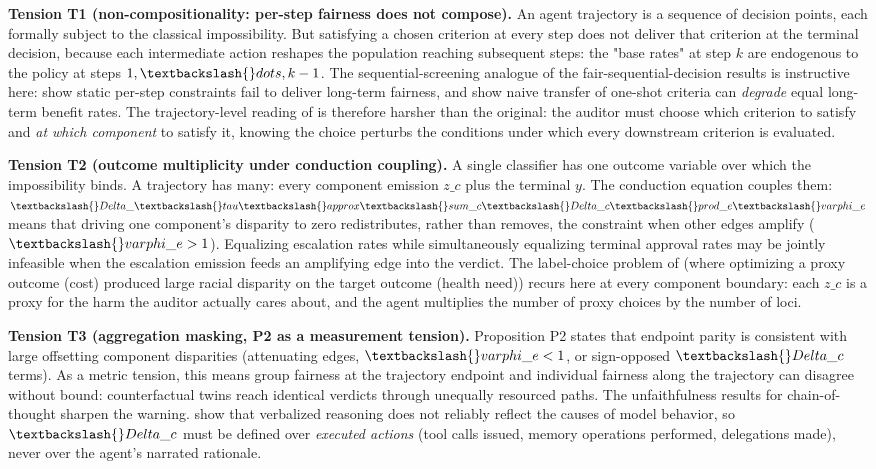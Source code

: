 \documentclass[10pt]{article}
\begin{document}
\textbf{Tension T1 (non-compositionality: per-step fairness does not compose).} An agent trajectory is a sequence of decision points, each formally subject to the classical impossibility. But satisfying a chosen criterion at every step does not deliver that criterion at the terminal decision, because each intermediate action reshapes the population reaching subsequent steps: the "base rates" at step $k$ are endogenous to the policy at steps $1, \textbackslash\{\}dots, k-1$. The sequential-screening analogue of the fair-sequential-decision results is instructive here: \cite{hu2022achieving} show static per-step constraints fail to deliver long-term fairness, and \cite{xu2024adapting} show naive transfer of one-shot criteria can \emph{degrade} equal long-term benefit rates. The trajectory-level reading of \cite{kleinberg2017inherent} is therefore harsher than the original: the auditor must choose which criterion to satisfy and \emph{at which component} to satisfy it, knowing the choice perturbs the conditions under which every downstream criterion is evaluated.

\textbf{Tension T2 (outcome multiplicity under conduction coupling).} A single classifier has one outcome variable over which the impossibility binds. A trajectory has many: every component emission $z\_c$ plus the terminal $y$. The conduction equation couples them: $\textbackslash\{\}Delta\_\textbackslash\{\}tau \textbackslash\{\}approx \textbackslash\{\}sum\_c \textbackslash\{\}Delta\_c \textbackslash\{\}prod\_e \textbackslash\{\}varphi\_e$ means that driving one component's disparity to zero redistributes, rather than removes, the constraint when other edges amplify ($\textbackslash\{\}varphi\_e > 1$). Equalizing escalation rates while simultaneously equalizing terminal approval rates may be jointly infeasible when the escalation emission feeds an amplifying edge into the verdict. The label-choice problem of \cite{obermeyer2019dissecting} (where optimizing a proxy outcome (cost) produced large racial disparity on the target outcome (health need)) recurs here at every component boundary: each $z\_c$ is a proxy for the harm the auditor actually cares about, and the agent multiplies the number of proxy choices by the number of loci.

\textbf{Tension T3 (aggregation masking, P2 as a measurement tension).} Proposition P2 states that endpoint parity is consistent with large offsetting component disparities (attenuating edges, $\textbackslash\{\}varphi\_e < 1$, or sign-opposed $\textbackslash\{\}Delta\_c$ terms). As a metric tension, this means group fairness at the trajectory endpoint and individual fairness along the trajectory can disagree without bound: counterfactual twins reach identical verdicts through unequally resourced paths. The unfaithfulness results for chain-of-thought sharpen the warning. \cite{turpin2023language} show that verbalized reasoning does not reliably reflect the causes of model behavior, so $\textbackslash\{\}Delta\_c$ must be defined over \emph{executed actions} (tool calls issued, memory operations performed, delegations made), never over the agent's narrated rationale.
\end{document}
